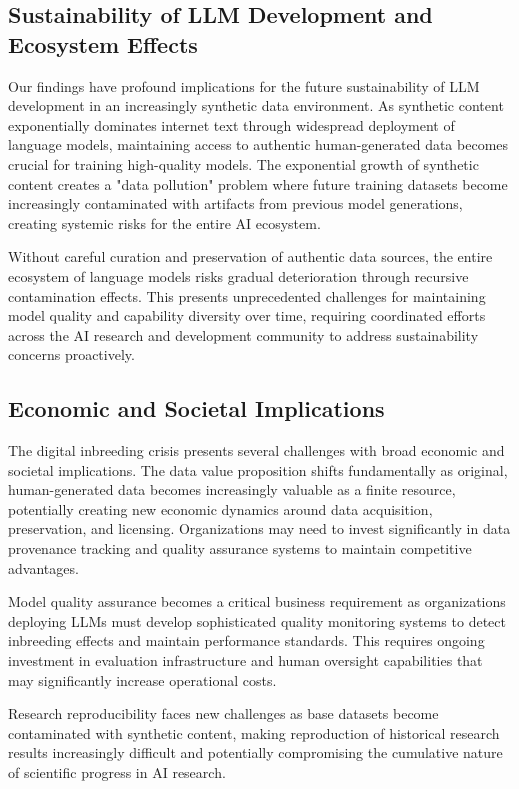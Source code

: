 \documentclass{article}
\begin{document}
\subsection{Sustainability of LLM Development and Ecosystem Effects}

Our findings have profound implications for the future sustainability of LLM development in an increasingly synthetic data environment. As synthetic content exponentially dominates internet text through widespread deployment of language models, maintaining access to authentic human-generated data becomes crucial for training high-quality models. The exponential growth of synthetic content creates a "data pollution" problem where future training datasets become increasingly contaminated with artifacts from previous model generations, creating systemic risks for the entire AI ecosystem.

Without careful curation and preservation of authentic data sources, the entire ecosystem of language models risks gradual deterioration through recursive contamination effects. This presents unprecedented challenges for maintaining model quality and capability diversity over time, requiring coordinated efforts across the AI research and development community to address sustainability concerns proactively.

\subsection{Economic and Societal Implications}

The digital inbreeding crisis presents several challenges with broad economic and societal implications. The data value proposition shifts fundamentally as original, human-generated data becomes increasingly valuable as a finite resource, potentially creating new economic dynamics around data acquisition, preservation, and licensing. Organizations may need to invest significantly in data provenance tracking and quality assurance systems to maintain competitive advantages.

Model quality assurance becomes a critical business requirement as organizations deploying LLMs must develop sophisticated quality monitoring systems to detect inbreeding effects and maintain performance standards. This requires ongoing investment in evaluation infrastructure and human oversight capabilities that may significantly increase operational costs.

Research reproducibility faces new challenges as base datasets become contaminated with synthetic content, making reproduction of historical research results increasingly difficult and potentially compromising the cumulative nature of scientific progress in AI research.
\end{document}
